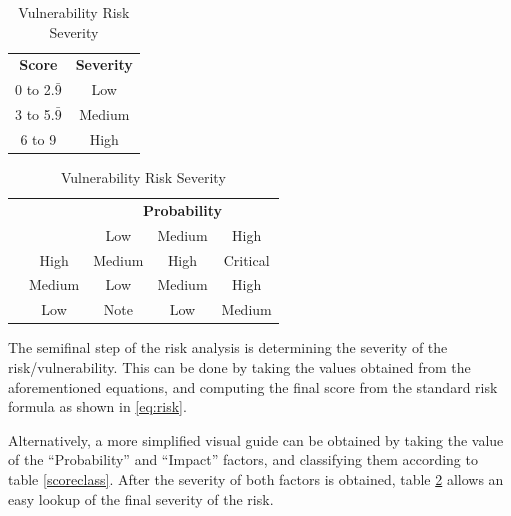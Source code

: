 \documentclass[a4paper,12pt]{article}
\begin{document}
	\begin{table}[!htbp]
		\begin{minipage}{.4\linewidth}
			\centering
			\begin{tabular}{cc}
				{\bf Score} & {\bf Severity} \\
				0 to 2.$\bar{9}$ & \cellcolor[HTML]{FCFF2F}Low \\
				3 to 5.$\bar{9}$ & \cellcolor[HTML]{F8A102}Medium \\
				6 to 9 & \cellcolor[HTML]{FE0000}High
			\end{tabular}
			\caption{Score Classification}
			\label{scoreclass}
		\end{minipage}
		\begin{minipage}{.6\linewidth}
			\centering
			\begin{tabular}{ccccc}
				\multicolumn{1}{l}{} & \multicolumn{1}{l}{} & \multicolumn{3}{c}{{\bf Probability}} \\
				\multicolumn{1}{l}{} &  & \cellcolor[HTML]{EFEFEF}Low & \cellcolor[HTML]{C0C0C0}Medium & \cellcolor[HTML]{9B9B9B}High \\
				& \cellcolor[HTML]{9B9B9B}High & \cellcolor[HTML]{F8A102}Medium & \cellcolor[HTML]{FE0000}High & \cellcolor[HTML]{FFCCC9}Critical \\
				& \cellcolor[HTML]{C0C0C0}Medium & \cellcolor[HTML]{FCFF2F}Low & \cellcolor[HTML]{F8A102}Medium & \cellcolor[HTML]{FE0000}High \\
				\multirow{-3}{*}{\rotatebox[origin=c]{90}{\bf Impact}} & \cellcolor[HTML]{EFEFEF}Low & \cellcolor[HTML]{34FF34}Note & \cellcolor[HTML]{FCFF2F}Low & \cellcolor[HTML]{F8A102}Medium
			\end{tabular}
			\caption{Vulnerability Risk Severity}
			\label{vulnrisksever}
		\end{minipage}
	\end{table}
	
	The semifinal step of the risk analysis is determining the severity of the risk/vulnerability. This can be done by taking the values obtained from the aforementioned equations, and computing the final score from the standard risk formula as shown in \ref{eq:risk}.
	
	Alternatively, a more simplified visual guide can be obtained by taking the value of the ``Probability'' and ``Impact'' factors, and classifying them according to table \ref{scoreclass}. After the severity of both factors is obtained, table \ref{vulnrisksever} allows an easy lookup of the final severity of the risk.
	
\end{document}
